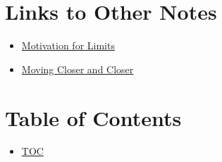 \section*{Links to Other Notes}
\begin{itemize}
  \item \hyperref[202501050700]{Motivation for Limits}
  \item \hyperref[202501070739]{Moving Closer and Closer}
\end{itemize}

\section*{Table of Contents}
\begin{itemize}
  \item \hyperref[toc]{TOC}
\end{itemize}

